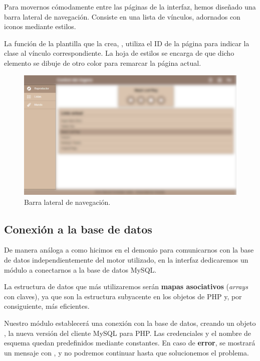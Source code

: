 Para movernos cómodamente entre las páginas de la interfaz, hemos diseñado una barra lateral de navegación. Consiste en una lista de vínculos, adornados con iconos mediante estilos. 

La función de la plantilla que la crea, , utiliza el ID de la página para indicar la clase  al vínculo correspondiente. La hoja de estilos se encarga de que dicho elemento se dibuje de otro color para remarcar la página actual.

\smallskip

\begin{figure}[H]
	\noindent \begin{centering}
		\includegraphics[width=\linewidth*3/4]{capitulo5/cap_navigation}
		\par\end{centering}
	\smallskip
	\caption{\label{fig:cap_navigation} Barra lateral de navegación.}
\end{figure} 

\smallskip

\subsection{Conexión a la base de datos}

De manera análoga a como hicimos en el demonio para comunicarnos con la base de datos independientemente del motor utilizado, en la interfaz dedicaremos un módulo a conectarnos a la base de datos MySQL.

La estructura de datos que más utilizaremos serán \textbf{mapas asociativos} (\textit{arrays} con claves), ya que son la estructura subyacente en los objetos de PHP y, por consiguiente, más eficientes.

Nuestro módulo establecerá una conexión con la base de datos, creando un objeto , la nueva versión del cliente MySQL para PHP. Las credenciales y el nombre de esquema quedan predefinidos mediante constantes. En caso de \textbf{error}, se mostrará un mensaje con , y no podremos continuar hasta que solucionemos el problema.

